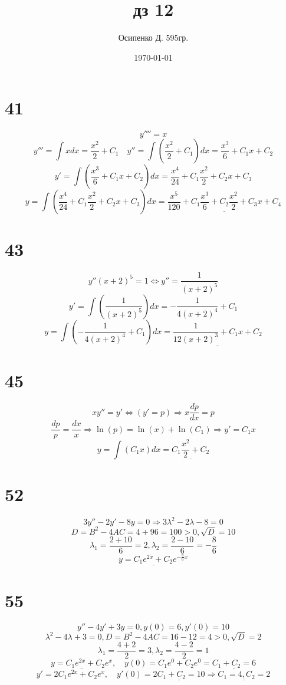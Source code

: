 \documentclass[a4paper, 12pt]{article}
\title{дз 12}
\author{Осипенко Д. 595гр.}
\date{\today}
\begin{document}
\sffamily
\maketitle
\section*{41}
\[
	y'''' = x
\]
\[
	y''' = \int x dx= \frac{x^2}{2}+C_1 \quad y'' = \int (\frac{x^2}{2}+C_1)dx = \frac{x^3}{6}+C_1x + C_2
\]
\[
	y' = \int(\frac{x^3}{6}+C_1x + C_2)dx = \frac{x^4}{24}+C_1\frac{x^2}{2} + C_2x + C_3
\]
\[
	y = \int(\frac{x^4}{24}+C_1\frac{x^2}{2} + C_2x + C_3)dx = \underline{\frac{x^5}{120}+C_1\frac{x^3}{6} + C_2\frac{x^2}{2} + C_3x + C_4}
\]
\section*{43}
\[
	y''(x+2)^5 = 1 \Leftrightarrow y'' = \frac{1}{(x+2)^5}
\]
\[
	y' = \int\left(\frac{1}{(x+2)^5}\right)dx = -\frac{1}{4(x+2)^4} + C_1
\]
\[
	y = \int\left(-\frac{1}{4(x+2)^4} + C_1\right)dx = \underline{\frac{1}{12(x+2)^3} + C_1x + C_2}
\]
\section*{45}
\[
	xy'' = y' \Leftrightarrow (y' = p) \Rightarrow x\frac{dp}{dx} =p
\]
\[
	\frac{dp}{p} = \frac{dx}{x} \Rightarrow \ln(p) = \ln(x) + \ln(C_1) \Rightarrow y' = C_1x
\]
\[
	y = \int(C_1x)dx = \underline{C_1\frac{x^2}{2} + C_2}
\]
\section*{52}
\[
	3y'' - 2y'-8y = 0 \Rightarrow  3\lambda^2 -2\lambda - 8=0
\]
\[
	D = B^2 - 4AC = 4 + 96 = 100 > 0, \sqrt D = 10
\]
\[
	\lambda_1 = \frac{2 + 10}{6} = 2, \lambda_2 =\frac{2-10}{6} = -\frac{8}{6}
\]
\[
	\underline{y = C_1e^{2x}+C_2e^{-\frac{8}{6}x}}
\]
\section*{55}
\[
	y'' -4y' + 3y = 0, y(0) = 6, y'(0) = 10
\]
\[
	\lambda^2 -4 \lambda + 3 = 0, D=B^2 - 4AC = 16 - 12 = 4 > 0 , \sqrt D = 2
\]
\[
	\lambda_1 = \frac{4 + 2}{2} = 3, \lambda_2 = \frac{4-2}{2} = 1
\]
\[
	\underline{y = C_1e^{2x}+C_2e^{x}},\quad y(0) =C_1e^{0}+C_2e^{0} = \underline{C_1 + C_2 = 6} 
\]
\[
	y' = 2C_1e^{2x} + C_2e^{x},\quad y'(0) = \underline{2C_1 + C_2 = 10} \Rightarrow \underline{C_1 = 4,C_2 = 2}
\]
\end{document}
